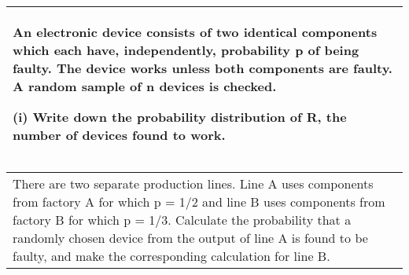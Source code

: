 \documentclass[a4paper,12pt]{article}
\begin{document}
  \begin{table}[ht!]
     \centering
     \begin{tabular}{|p{15cm}|}
     \hline
An electronic device consists of two identical components which each have, independently, probability p of being faulty.  The device works unless both components are faulty.  A random sample of n devices is checked. 
 
(i) Write down the probability distribution of R, the number of devices found to work. \\
 \hline
      \end{tabular}
    \end{table}
    
    
  \begin{table}[ht!]
     \centering
     \begin{tabular}{|p{15cm}|}
     \hline
There are two separate production lines.  Line A uses components from factory A for which p = 1/2 and line B uses components from factory B for which p = 1/3.  Calculate the probability that a randomly chosen device from the output of line A is found to be faulty, and make the corresponding calculation for line B. 


      \end{tabular}
    \end{table}
\end{document}
